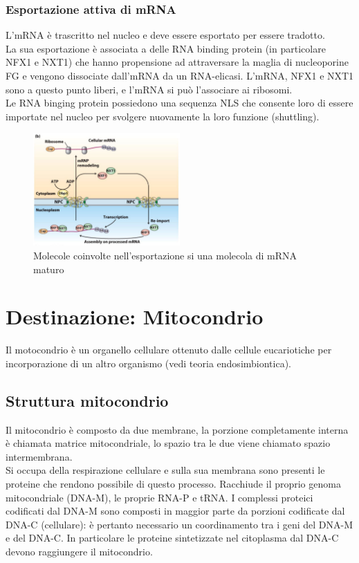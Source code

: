         \subsubsection{Esportazione attiva di mRNA}
            L'mRNA è trascritto nel nucleo e deve essere esportato per essere tradotto.\\
            La sua esportazione è associata a delle RNA binding protein (in particolare NFX1 e NXT1) che hanno propensione ad attraversare la maglia di nucleoporine FG e vengono dissociate dall'mRNA da un RNA-elicasi. 
            L'mRNA, NFX1 e NXT1 sono a questo punto liberi, e l'mRNA si può l'associare ai ribosomi.\\
            Le RNA binging protein possiedono una sequenza NLS che consente loro di essere importate nel nucleo per svolgere nuovamente la loro funzione (shuttling).
            \begin{figure}[h]
                \centering
                \includegraphics[width=0.5\textwidth]{images/exportNucleomRNA.JPG}
                \caption{\small Molecole coinvolte nell'esportazione si una molecola di mRNA maturo}
                \label{fig:mesh1}
            \end{figure}
    
\section{Destinazione: Mitocondrio}
    Il motocondrio è un organello cellulare ottenuto dalle cellule eucariotiche per incorporazione di un altro organismo (vedi teoria endosimbiontica). 
    \subsection{Struttura mitocondrio}
        Il mitocondrio è composto da due membrane, la porzione completamente interna è chiamata matrice mitocondriale, lo spazio tra le due viene chiamato spazio intermembrana.\\
        Si occupa della respirazione cellulare e sulla sua membrana sono presenti le proteine che rendono possibile di questo processo. Racchiude il proprio genoma mitocondriale (DNA-M), le proprie RNA-P e tRNA. I complessi proteici codificati dal DNA-M sono composti in maggior parte da porzioni codificate dal DNA-C (cellulare): è pertanto necessario un coordinamento tra i geni del DNA-M e del DNA-C.
        In particolare le proteine sintetizzate nel citoplasma dal DNA-C devono raggiungere il mitocondrio.
        
